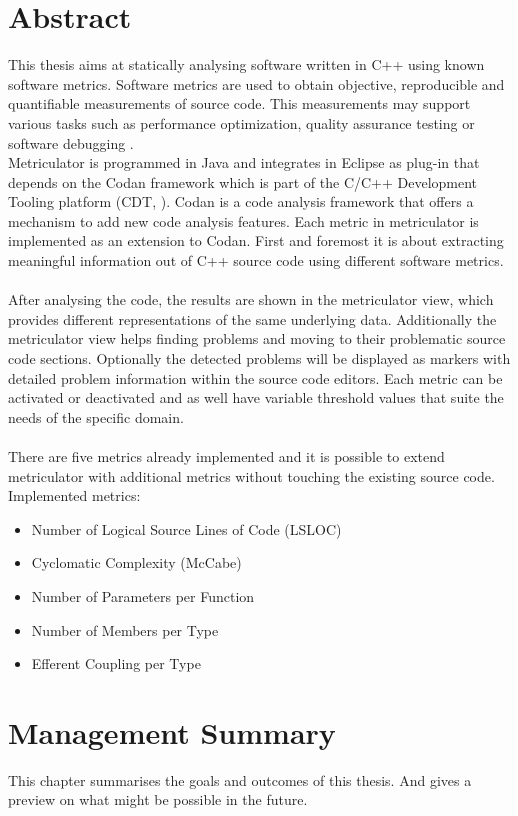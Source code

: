 \documentclass[11pt,a4paper,oneside]{scrreprt}
\begin{document}
\chapter*{Abstract}
This thesis aims at statically analysing software written in C++ using known software metrics. Software metrics are used to obtain objective, reproducible and quantifiable measurements of source code. This measurements may support various tasks such as performance optimization, quality assurance testing or software debugging \cite{wiki_softwaremetric}.\\
Metriculator is programmed in Java and integrates in Eclipse as plug-in that depends on the Codan \cite{codan} framework which is part of the C/C++ Development Tooling platform (CDT, \cite{CDT}). Codan is a code analysis framework that offers a mechanism to add new code analysis features. Each metric in metriculator is implemented as an extension to Codan. First and foremost it is about extracting meaningful information out of C++ source code using different software metrics.
\\\\
After analysing the code, the results are shown in the metriculator view, which provides different representations of the same underlying data. Additionally the metriculator view helps finding problems and moving to their problematic source code sections. Optionally the detected problems will be displayed as markers with detailed problem information within the source code editors. Each metric can be activated or deactivated and as well have variable threshold values that suite the needs of the specific domain.
\\\\
There are five metrics already implemented and it is possible to extend metriculator with additional metrics without touching the existing source code.
Implemented metrics:
\begin{itemize}
\item Number of Logical Source Lines of Code (LSLOC)
\item Cyclomatic Complexity (McCabe)
\item Number of Parameters per Function
\item Number of Members per Type
\item Efferent Coupling per Type
\end{itemize}

\newpage
\thispagestyle{empty}
\mbox{}
\newpage

\chapter*{Management Summary}
This chapter summarises the goals and outcomes of this thesis. And gives a preview on what might be possible in the future.
\end{document}
